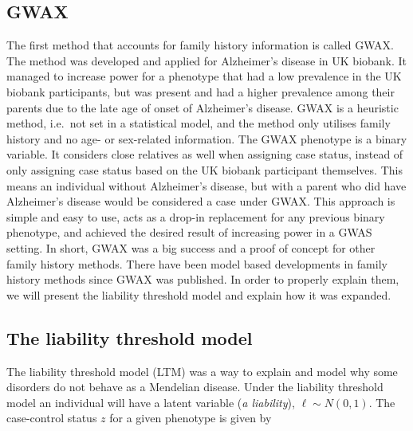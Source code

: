 \subsection{GWAX}
The first method that accounts for family history information is called GWAX. The method was developed and applied for Alzheimer's disease in UK biobank\cite{gwax}. It managed to increase power for a phenotype that had a low prevalence in the UK biobank participants, but was present and had a higher prevalence among their parents due to the late age of onset of Alzheimer's disease. GWAX is a heuristic method, i.e.\ not set in a statistical model, and the method only utilises family history and no age- or sex-related information. The GWAX phenotype is a binary variable. It considers close relatives as well when assigning case status, instead of only assigning case status based on the UK biobank participant themselves. This means an individual without Alzheimer's disease, but with a parent who did have Alzheimer's disease would be considered a case under GWAX. This approach is simple and easy to use, acts as a drop-in replacement for any previous binary phenotype, and achieved the desired result of increasing power in a GWAS setting. In short, GWAX was a big success and a proof of concept for other family history methods. There have been model based developments in family history methods since GWAX was published. In order to properly explain them, we will present the liability threshold model and explain how it was expanded.


\subsection{The liability threshold model}
The liability threshold model (LTM) was a way to explain and model why some disorders do not behave as a Mendelian disease. Under the liability threshold model an individual will have a latent variable (\textit{a liability}), $ \ell \sim N(0,1)$. The case-control status $ z $ for a given phenotype is given by 

